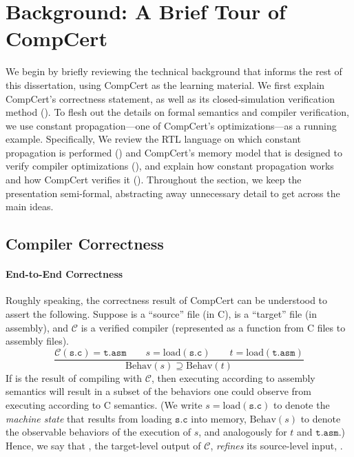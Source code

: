\section{Background: A Brief Tour of CompCert}
\label{sec:background}

We begin by briefly reviewing the technical background that informs the rest of this dissertation,
using CompCert as the learning material.  We first explain CompCert's correctness statement, as well
as its closed-simulation verification method ().  To flesh out the
details on formal semantics and compiler verification, we use constant propagation---one of
CompCert's optimizations---as a running example.  Specifically, We review the RTL language on which
constant propagation is performed () and CompCert's memory model that is
designed to verify compiler optimizations (), and explain how constant
propagation works and how CompCert verifies it ().  Throughout the
section, we keep the presentation semi-formal, abstracting away unnecessary detail to get across the
main ideas.


\subsection{Compiler Correctness}
\label{sec:background:correctness}

\paragraph{End-to-End Correctness}

Roughly speaking, the correctness result of CompCert can be understood to assert the following.
Suppose  is a ``source'' file (in C),  is a ``target'' file (in assembly), and
$\mathcal{C}$ is a verified compiler (represented as a function from C files to assembly files).
\[
\frac{
\mathcal{C}(\mathtt{s.c}) = \mathtt{t.asm} \qquad
s = \mathrm{load}(\mathtt{s.c})\qquad
t = \mathrm{load}(\mathtt{t.asm})}
{\mathrm{Behav}(s) \supseteq \mathrm{Behav}(t)}
\]
If  is the result of compiling  with $\mathcal{C}$, then executing
 according to assembly semantics will result in a subset of the behaviors one could
observe from executing  according to C semantics.  (We write
$s = \mathrm{load}(\mathtt{s.c})$ to denote the \emph{machine state} that results from loading
$\mathtt{s.c}$ into memory, $\mathrm{Behav}(s)$ to denote the observable behaviors of the execution
of $s$, and analogously for $t$ and $\mathtt{t.asm}$.)  Hence, we say that , the
target-level output of $\mathcal{C}$, \emph{refines} its source-level input, .


